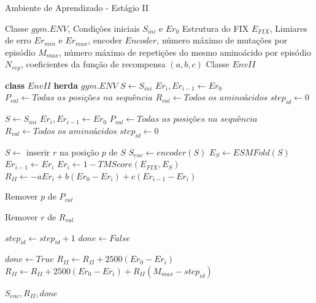 \begin{algorithm}[H]
  \caption{Ambiente de Aprendizado - Estágio II}
  \label{alg:EnvII}
  \begin{algorithmic}[1]
  \Require Classe $gym.ENV$, 
  \State         Condições iniciais $S_{ini}$ e $Er_{0}$
  \State         Estrutura do FIX $E_{FIX}$, 
  \State         Limiares de erro $Er_{min}$ e $Er_{max}$,
  \State         encoder $Encoder$,
  \State         número máximo de mutações por episódio $M_{max}$, 
  \State         número máximo de repetições do mesmo aminoácido por episódio $N_{rep}$,
  \State         coeficientes da função de recompensa $(a, b, c)$
  \Ensure Classe $EnvII$

  \State \textbf{class} $EnvII$ \textbf{herda} $gym.ENV$
  \State \quad $S \gets S_{ini}$
  \State \quad $Er_{i}, Er_{i-1} \gets Er_{0}$
  \State \quad $P_{val} \gets \textit{Todas as posições na sequência}$
  \State \quad $R_{val} \gets \textit{Todos os aminoácidos}$
  \State \quad $step_{id} \gets 0$

      \State $S \gets S_{ini}$
      \State $Er_{i}, Er_{i-1} \gets Er_{0}$
      \State $P_{val} \gets \textit{Todas as posições na sequência}$
      \State $R_{val} \gets \textit{Todos os aminoácidos}$
      \State $step_{id} \gets 0$
  \EndFunction

      \State $S \gets$ inserir $r$ na posição $p$ de $S$
      \State $S_{enc} \gets encoder(S)$
      \State $E_{S} \gets ESMFold(S)$
      \State $Er_{i-1} \gets Er_{i}$
      \State $Er_{i} \gets 1 - TMScore(E_{FIX}, E_{S})$
      \State $R_{II} \gets -aEr_{i} + b(Er_{0} - Er_{i}) + c(Er_{i-1} - Er_{i})$
      
          \State Remover $p$ de $P_{val}$
      \EndIf

          \State Remover $r$ de $R_{val}$
      \EndIf

      \State $step_{id} \gets step_{id} + 1$
      \State $done \gets \textit{False}$

          \State $done \gets \textit{True}$
              \State $R_{II} \gets R_{II} + 2500(Er_{0} - Er_{i})$
          \EndIf
              \State $R_{II} \gets R_{II} + 2500(Er_{0} - Er_{i}) + R_{II}(M_{max} - step_{id})$ 
          \EndIf
      \EndIf

      \State \Return $S_{enc}, R_{II}, done$
  \EndFunction

  \end{algorithmic}
\end{algorithm}

